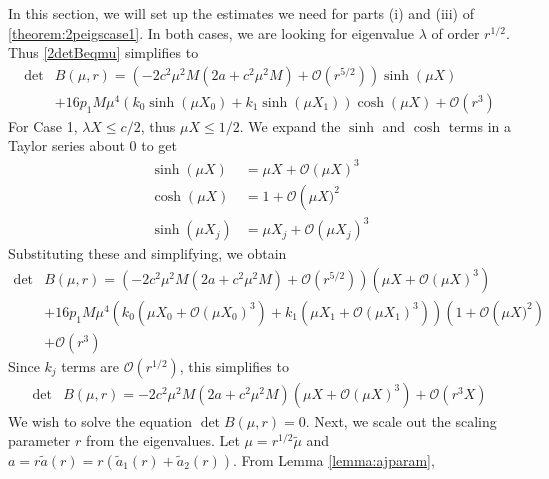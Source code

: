 \documentclass[thesis.tex]{subfiles}
\begin{document}
In this section, we will set up the estimates we need for parts (i) and (iii) of \cref{theorem:2peigscase1}. In both cases, we are looking for eigenvalue $\lambda$ of order $r^{1/2}$. Thus \cref{2detBeqmu} simplifies to
\begin{equation}\label{2detBint1}
\begin{aligned}
\det &B(\mu, r) = \left(-2 c^2 \mu^2 M (2a + c^2 \mu^2 M) +  \mathcal{O}( r^{5/2} )\right) \sinh(\mu X) \\
&+16 p_1 M \mu^4 ( k_0\sinh(\mu X_0) + k_1 \sinh(\mu X_1) ) \cosh(\mu X) + \mathcal{O}( r^3 ) 
\end{aligned}
\end{equation}
For Case 1, $\lambda X \leq c/2$, thus $\mu X \leq 1/2$. We expand the $\sinh$ and $\cosh$ terms in a Taylor series about 0 to get
\begin{align*}
\sinh(\mu X) &= \mu X + \mathcal{O}\left(\mu X \right)^3 \\
\cosh(\mu X) &= 1 + \mathcal{O}\left(\mu X)^2 \\
\sinh(\mu X_j) &= \mu X_j + \mathcal{O}\left(\mu X_j \right)^3
\end{align*}
Substituting these and simplifying, we obtain 
\begin{equation}\label{2detBint2}
\begin{aligned}
\det &B(\mu, r) = \left(-2 c^2 \mu^2 M (2a + c^2 \mu^2 M) +  \mathcal{O}( r^{5/2} )\right) \left(\mu X + \mathcal{O}\left(\mu X \right)^3 \right) \\
&+16 p_1 M \mu^4 \left( k_0\left( \mu X_0 + \mathcal{O}\left(\mu X_0 \right)^3\right) + k_1\left( \mu X_1 + \mathcal{O}\left(\mu X_1 \right)^3\right) \right) \left( 1 + \mathcal{O}\left(\mu X)^2\right) \\
&+ \mathcal{O}( r^3 ) 
\end{aligned}
\end{equation}
Since $k_j$ terms are $\mathcal{O}(r^{1/2})$, this simplifies to 
\begin{equation}\label{2detBint2}
\begin{aligned}
\det &B(\mu, r) = -2 c^2 \mu^2 M (2a + c^2 \mu^2 M)\left( \mu X + \mathcal{O}\left(\mu X \right)^3 \right) 
+ \mathcal{O}( r^3 X ) 
\end{aligned}
\end{equation}
We wish to solve the equation $\det B(\mu, r) = 0$. Next, we scale out the scaling parameter $r$ from the eigenvalues. Let $\mu = r^{1/2}\tilde{\mu}$ and $a = r \tilde{a}(r) = r (\tilde{a}_1(r) + \tilde{a}_2(r))$. From Lemma \ref{lemma:ajparam}, 
\end{document}
